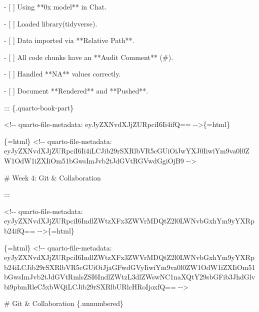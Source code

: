 \documentclass[
  letterpaper,
  DIV=11,
  numbers=noendperiod,
  oneside]{scrreprt}
\newenvironment{Shaded}{\begin{snugshade}}{\end{snugshade}}
\newcommand{\FunctionTok}[1]{\textcolor[rgb]{0.28,0.35,0.67}{#1}}
\newcommand{\InformationTok}[1]{\textcolor[rgb]{0.37,0.37,0.37}{#1}}
\newcommand{\NormalTok}[1]{\textcolor[rgb]{0.00,0.23,0.31}{#1}}
\newcommand{\SpecialStringTok}[1]{\textcolor[rgb]{0.13,0.47,0.30}{#1}}
\newcommand{\VariableTok}[1]{\textcolor[rgb]{0.07,0.07,0.07}{#1}}
\begin{document}
\begin{Shaded}
\begin{Highlighting}[numbers=left,,]
\SpecialStringTok{{-}   }\VariableTok{[ ]}\NormalTok{ Using **0x model** in Chat.}

\SpecialStringTok{{-}   }\VariableTok{[ ]}\NormalTok{ Loaded }\InformationTok{\textasciigrave{}library(tidyverse)\textasciigrave{}}\NormalTok{.}

\SpecialStringTok{{-}   }\VariableTok{[ ]}\NormalTok{ Data imported via **Relative Path**.}

\SpecialStringTok{{-}   }\VariableTok{[ ]}\NormalTok{ All code chunks have an **Audit Comment** (}\InformationTok{\textasciigrave{}\#\textasciigrave{}}\NormalTok{).}

\SpecialStringTok{{-}   }\VariableTok{[ ]}\NormalTok{ Handled **NA** values correctly.}

\SpecialStringTok{{-}   }\VariableTok{[ ]}\NormalTok{ Document **Rendered** and **Pushed**.}


\NormalTok{::: \{.quarto{-}book{-}part\}}


\InformationTok{\textasciigrave{}\textless{}!{-}{-} quarto{-}file{-}metadata: eyJyZXNvdXJjZURpciI6Ii4ifQ== {-}{-}\textgreater{}\textasciigrave{}}\NormalTok{\{=html\}}

\InformationTok{\textasciigrave{}\textasciigrave{}\textasciigrave{}\{=html\}}
\InformationTok{\textless{}!{-}{-} quarto{-}file{-}metadata: eyJyZXNvdXJjZURpciI6Ii4iLCJib29rSXRlbVR5cGUiOiJwYXJ0IiwiYm9va0l0ZW1OdW1iZXIiOm51bGwsImJvb2tJdGVtRGVwdGgiOjB9 {-}{-}\textgreater{}}
\InformationTok{\textasciigrave{}\textasciigrave{}\textasciigrave{}}

\FunctionTok{\# Week 4: Git \& Collaboration}


\NormalTok{:::}



\InformationTok{\textasciigrave{}\textless{}!{-}{-} quarto{-}file{-}metadata: eyJyZXNvdXJjZURpciI6IndlZWtzXFx3ZWVrMDQtZ2l0LWNvbGxhYm9yYXRpb24ifQ== {-}{-}\textgreater{}\textasciigrave{}}\NormalTok{\{=html\}}

\InformationTok{\textasciigrave{}\textasciigrave{}\textasciigrave{}\{=html\}}
\InformationTok{\textless{}!{-}{-} quarto{-}file{-}metadata: eyJyZXNvdXJjZURpciI6IndlZWtzXFx3ZWVrMDQtZ2l0LWNvbGxhYm9yYXRpb24iLCJib29rSXRlbVR5cGUiOiJjaGFwdGVyIiwiYm9va0l0ZW1OdW1iZXIiOm51bGwsImJvb2tJdGVtRmlsZSI6IndlZWtzL3dlZWswNC1naXQtY29sbGFib3JhdGlvbi9pbmRleC5xbWQiLCJib29rSXRlbURlcHRoIjoxfQ== {-}{-}\textgreater{}}
\InformationTok{\textasciigrave{}\textasciigrave{}\textasciigrave{}}

\FunctionTok{\# Git \& Collaboration \{.unnumbered\}}



\end{Highlighting}
\end{Shaded}
\end{document}
